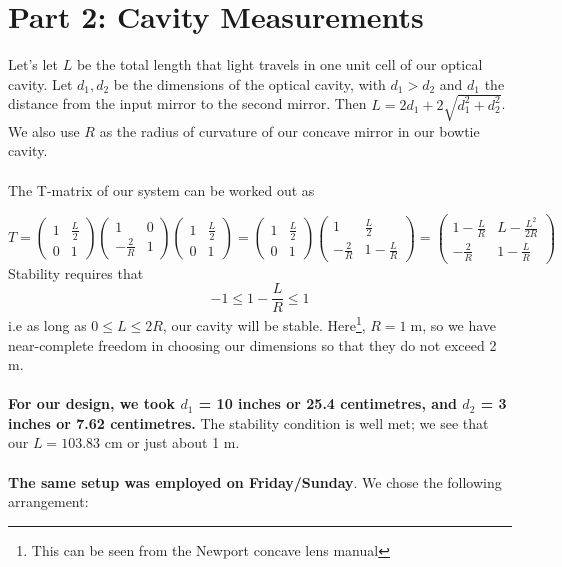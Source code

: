 \documentclass[10pt,a4paper]{article}
\begin{document}
\section*{Part 2: Cavity Measurements}
Let's let $L$ be the total length that light travels in one unit cell of our optical cavity. Let $d_{1}, d_{2}$ be the dimensions of the optical cavity, with $d_{1} > d_{2}$ and $d_{1}$ the distance from the input mirror to the second mirror. Then $L = 2d_{1} + 2\sqrt{d_{1}^{2} + d_{2}^{2}}$. We also use $R$ as the radius of curvature of our concave mirror in our bowtie cavity.\\
\\
The T-matrix of our system can be worked out as 

$$T = \begin{pmatrix}
1 & \frac{L}{2}\\
0 & 1
\end{pmatrix}\begin{pmatrix}
1 & 0\\
-\frac{2}{R} & 1
\end{pmatrix}\begin{pmatrix}
1 & \frac{L}{2}\\
0 & 1
\end{pmatrix} = \begin{pmatrix}
1 & \frac{L}{2}\\
0 & 1
\end{pmatrix}\begin{pmatrix}
1 & \frac{L}{2}\\
-\frac{2}{R} & 1 - \frac{L}{R}
\end{pmatrix} = \begin{pmatrix}
1 - \frac{L}{R} & L - \frac{L^{2}}{2R}\\
-\frac{2}{R} & 1 - \frac{L}{R}
\end{pmatrix}
$$
Stability requires that $$-1 \leq 1 - \frac{L}{R} \leq 1$$ i.e as long as $0 \leq L \leq 2R$, our cavity will be stable. Here\footnote{This can be seen from the Newport concave lens manual}, $R = 1\;\mathrm{m}$, so we have near-complete freedom in choosing our dimensions so that they do not exceed 2 m.\\
\\
\textbf{For our design, we took $d_{1}$ = 10 inches or 25.4 centimetres, and $d_{2}$ = 3 inches or 7.62 centimetres.} The stability condition is well met; we see that our $L = 103.83$ cm or just about 1 m.\\
\\
\textbf{The same setup was employed on Friday/Sunday}. We chose the following arrangement:
\end{document}
